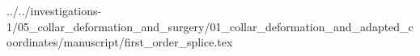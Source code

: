 ../../investigations-1/05_collar_deformation_and_surgery/01_collar_deformation_and_adapted_coordinates/manuscript/first_order_splice.tex